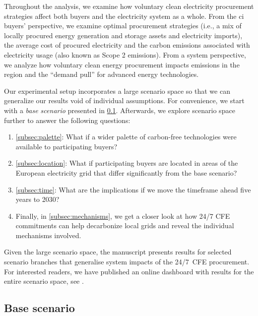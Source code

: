 
Throughout the analysis, we examine how voluntary clean electricity procurement strategies affect both buyers and the electricity system as a whole.
From the \gls{ci} buyers' perspective, we examine optimal procurement strategies (i.e., a mix of locally procured energy generation and storage assets and electricity imports), the average cost of procured electricity and the carbon emissions associated with electricity usage (also known as Scope 2 emissions).
From a system perspective, we analyze how voluntary clean energy procurement impacts \co emissions in the region and the \enquote{demand pull} for advanced energy technologies.

Our experimental setup incorporates a large scenario space so that we can generalize our results void of individual assumptions.
For convenience, we start with a \textit{base scenario} presented in \cref{subsec:base}.
Afterwards, we explore scenario space further to answer the following questions:

\begin{enumerate}[-]
\item \cref{subsec:palette}: What if a wider palette of carbon-free technologies were available to participating buyers?
\item \cref{subsec:location}: What if participating buyers are located in areas of the European electricity grid that differ significantly from the base scenario?
\item \cref{subsec:time}: What are the implications if we move the timeframe ahead five years to 2030?
\item Finally, in \cref{subsec:mechanisms}, we get a closer look at how 24/7 CFE commitments can help decarbonize local grids and reveal the individual mechanisms involved.
\end{enumerate}

Given the large scenario space, the manuscript presents results for selected scenario branches that generalise system impacts of the 24/7~CFE procurement.
For interested readers, we have published an online dashboard with results for the entire scenario space, see .

\subsection{Base scenario}
\label{subsec:base}

